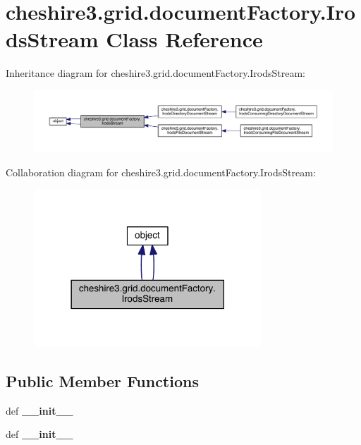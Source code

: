 \hypertarget{classcheshire3_1_1grid_1_1document_factory_1_1_irods_stream}{\section{cheshire3.\-grid.\-document\-Factory.\-Irods\-Stream Class Reference}
\label{classcheshire3_1_1grid_1_1document_factory_1_1_irods_stream}
}


Inheritance diagram for cheshire3.\-grid.\-document\-Factory.\-Irods\-Stream\-:
\nopagebreak
\begin{figure}[H]
\begin{center}
\leavevmode
\includegraphics[width=350pt]{classcheshire3_1_1grid_1_1document_factory_1_1_irods_stream__inherit__graph}
\end{center}
\end{figure}


Collaboration diagram for cheshire3.\-grid.\-document\-Factory.\-Irods\-Stream\-:
\nopagebreak
\begin{figure}[H]
\begin{center}
\leavevmode
\includegraphics[width=242pt]{classcheshire3_1_1grid_1_1document_factory_1_1_irods_stream__coll__graph}
\end{center}
\end{figure}
\subsection*{Public Member Functions}
\begin{DoxyCompactItemize}
\item 
\hypertarget{classcheshire3_1_1grid_1_1document_factory_1_1_irods_stream_aa099d73433592f0f7f295c035f59b9e7}{def {\bfseries \-\_\-\-\_\-init\-\_\-\-\_\-}}\label{classcheshire3_1_1grid_1_1document_factory_1_1_irods_stream_aa099d73433592f0f7f295c035f59b9e7}

\item 
\hypertarget{classcheshire3_1_1grid_1_1document_factory_1_1_irods_stream_aa099d73433592f0f7f295c035f59b9e7}{def {\bfseries \-\_\-\-\_\-init\-\_\-\-\_\-}}\label{classcheshire3_1_1grid_1_1document_factory_1_1_irods_stream_aa099d73433592f0f7f295c035f59b9e7}

\end{DoxyCompactItemize}
